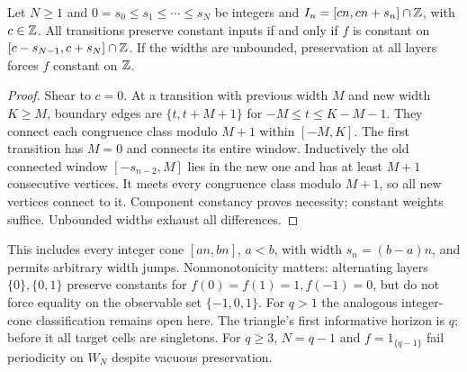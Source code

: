 \begin{theorem}\label{thm:funnels}
Let $N\ge1$ and $0=s_0\le s_1\le\cdots\le s_N$ be integers and $I_n=[cn,cn+s_n]\cap\mathbb Z$, with $c\in\mathbb Z$. All transitions preserve constant inputs if and only if $f$ is constant on $[c-s_{N-1},c+s_N]\cap\mathbb Z$. If the widths are unbounded, preservation at all layers forces $f$ constant on $\mathbb Z$.
\end{theorem}
\begin{proof}
Shear to $c=0$. At a transition with previous width $M$ and new width $K\ge M$, boundary edges are $\{t,t+M+1\}$ for $-M\le t\le K-M-1$. They connect each congruence class modulo $M+1$ within $[-M,K]$. The first transition has $M=0$ and connects its entire window. Inductively the old connected window $[-s_{n-2},M]$ lies in the new one and has at least $M+1$ consecutive vertices. It meets every congruence class modulo $M+1$, so all new vertices connect to it. Component constancy proves necessity; constant weights suffice. Unbounded widths exhaust all differences.
\end{proof}
This includes every integer cone $[an,bn]$, $a<b$, with width $s_n=(b-a)n$, and permits arbitrary width jumps. Nonmonotonicity matters: alternating layers $\{0\},\{0,1\}$ preserve constants for $f(0)=f(1)=1,f(-1)=0$, but do not force equality on the observable set $\{-1,0,1\}$. For $q>1$ the analogous integer-cone classification remains open here. The triangle's first informative horizon is $q$; before it all target cells are singletons. For $q\ge3$, $N=q-1$ and $f=1_{\{q-1\}}$ fail periodicity on $W_N$ despite vacuous preservation.
